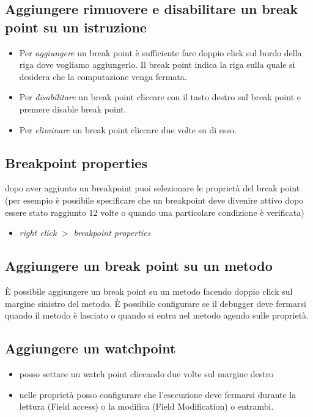 \documentclass{article}
\begin{document}
\subsection{Aggiungere rimuovere e disabilitare un break point su un istruzione}
\begin{itemize}
\item Per \textit{aggiungere} un break point \`e sufficiente fare doppio click sul bordo della riga dove vogliamo aggiungerlo. Il break point indica la riga sulla quale si desidera che la computazione venga fermata.
\item  Per \textit{disabilitare} un break point cliccare con il tasto destro sul break point e premere disable break point.
\item  Per \textit{eliminare} un break point cliccare due volte su di esso.
\end{itemize}

\subsection{Breakpoint properties}
dopo aver aggiunto un breakpoint puoi selezionare le propriet\`a del break point (per esempio \`e possibile specificare che un breakpoint deve divenire attivo dopo  essere stato raggiunto 12 volte o quando una particolare condizione \`e verificata)
\begin{itemize}
\item \textit{right click} $>$ \textit{breakpoint properties}
\end{itemize}


\subsection{Aggiungere un break point su un metodo}
\`E possibile aggiungere un break point su un metodo facendo doppio click sul margine sinistro del metodo.
\`E possibile configurare se il debugger deve fermarsi quando il metodo \`e lasciato o quando si entra nel metodo agendo sulle propriet\`a.

\subsection{Aggiungere un watchpoint}
\begin{itemize}
\item posso settare un watch point cliccando due volte sul margine destro
\item  nelle propriet\`a posso configurare che l'esecuzione deve fermarsi durante la lettura (Field access)  o la modifica (Field Modification) o entrambi.
\end{itemize}
\end{document}
